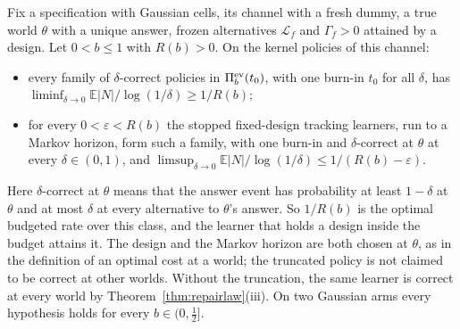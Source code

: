 \begin{theorem}
\label{thm:optrate}
Fix a specification with Gaussian cells, its channel with a fresh dummy, a true world $\theta$
with a unique answer, frozen alternatives $\mathcal L_f$ and $\Gamma_f>0$ attained by a design.
Let $0<b\le1$ with $R(b)>0$. On the kernel policies of this channel:
\begin{itemize}
\item every family of $\delta$-correct policies in $\Pi_b^{\rm ev}(t_0)$, with one burn-in $t_0$
for all $\delta$, has $\liminf_{\delta\to0}\mathbb E|N|/\log(1/\delta)\ge1/R(b)$;
\item for every $0<\varepsilon<R(b)$ the stopped fixed-design tracking learners, run to a Markov
horizon, form such a family, with one burn-in and $\delta$-correct at $\theta$ at every
$\delta\in(0,1)$, and
$\limsup_{\delta\to0}\mathbb E|N|/\log(1/\delta)\le1/(R(b)-\varepsilon)$.
\end{itemize}
Here $\delta$-correct at $\theta$ means that the answer event has probability at least $1-\delta$ at
$\theta$ and at most $\delta$ at every alternative to $\theta$'s answer. So $1/R(b)$ is the optimal
budgeted rate over this class, and the learner that holds a design inside the budget attains it.
The design and the Markov horizon are both chosen at $\theta$, as in the definition of an optimal
cost at a world; the truncated policy is not claimed to be correct at other worlds. Without the
truncation, the same learner is correct at every world by Theorem~\ref{thm:repairlaw}(iii). On two Gaussian arms every hypothesis holds for every
$b\in(0,\frac12]$.
\end{theorem}
